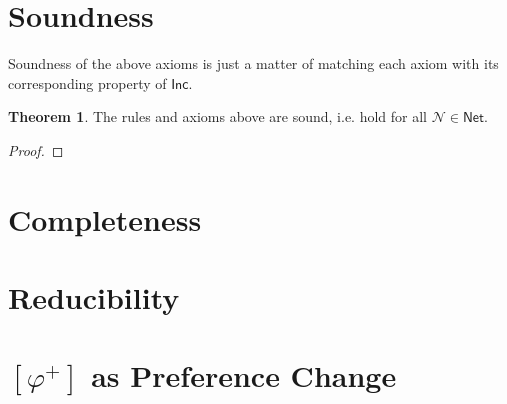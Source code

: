 \documentclass[12pt]{article}
\theoremstyle{definition}
\newtheorem{theorem}{Theorem}
\newtheorem{lemma}[theorem]{Lemma}
\newcommand{\semantics}[1]{[\![\mbox{\em $ #1 $\/}]\!]}
\newcommand{\Inc}{\textsf{Inc}}
\newcommand{\AllNets}{\mathsf{Net}}
\newcommand{\Net}{\mathcal{N}}
\begin{document}


\section{\textcolor{myblue}{Soundness}}

Soundness of the above axioms is just a matter of matching each axiom with its corresponding property of $\Inc$.

\begin{theorem}
The rules and axioms above are sound, i.e. hold for all $\Net \in \AllNets$.
\end{theorem}
\begin{proof}

\end{proof}

\section{\textcolor{myblue}{Completeness}}



\section{\textcolor{myblue}{Reducibility}}



\section{\textcolor{myblue}{$[\varphi^+]$ as Preference Change}}
\end{document}
